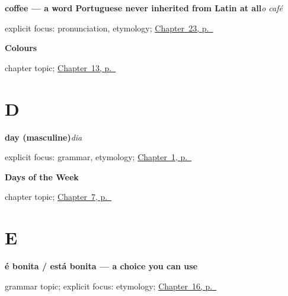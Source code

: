 \noindent\begin{minipage}[t]{\linewidth}
\raggedright
\textbf{coffee — a word Portuguese never inherited from Latin at all}\enspace\emph{o café}\par
\footnotesize explicit focus: pronunciation, etymology; \hyperref[ch:pt-coffee-tea-milk]{Chapter~23, p.~\pageref*{ch:pt-coffee-tea-milk}}
\end{minipage}\par\smallskip

\noindent\begin{minipage}[t]{\linewidth}
\raggedright
\textbf{Colours}\par
\footnotesize chapter topic; \hyperref[ch:pt-colours]{Chapter~13, p.~\pageref*{ch:pt-colours}}
\end{minipage}\par\smallskip

\section*{D}

\noindent\begin{minipage}[t]{\linewidth}
\raggedright
\textbf{day (masculine)}\enspace\emph{dia}\par
\footnotesize explicit focus: grammar, etymology; \hyperref[ch:greetings]{Chapter~1, p.~\pageref*{ch:greetings}}
\end{minipage}\par\smallskip

\noindent\begin{minipage}[t]{\linewidth}
\raggedright
\textbf{Days of the Week}\par
\footnotesize chapter topic; \hyperref[ch:pt-days-of-the-week]{Chapter~7, p.~\pageref*{ch:pt-days-of-the-week}}
\end{minipage}\par\smallskip

\section*{E}

\noindent\begin{minipage}[t]{\linewidth}
\raggedright
\textbf{é bonita / está bonita — a choice you can use}\par
\footnotesize grammar topic; explicit focus: etymology; \hyperref[ch:pt-ser-and-estar]{Chapter~16, p.~\pageref*{ch:pt-ser-and-estar}}
\end{minipage}\par\smallskip

